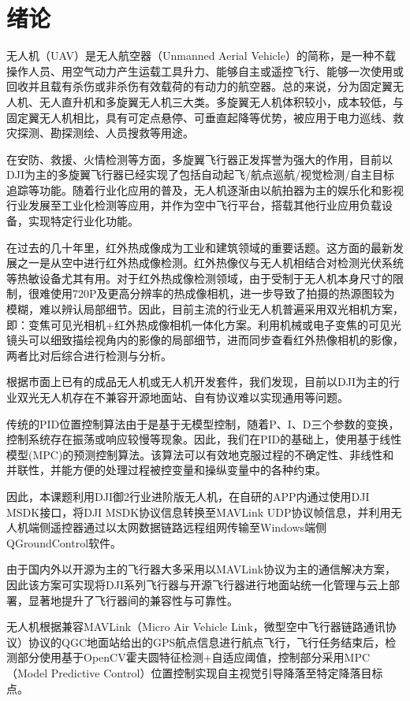 \chapter{绪论}

无人机（UAV）是无人航空器（Unmanned Aerial Vehicle）的简称，是一种不载操作人员、用空气动力产生运载工具升力、能够自主或遥控飞行、能够一次使用或回收并且载有杀伤或非杀伤有效载荷的有动力的航空器。总的来说，分为固定翼无人机、无人直升机和多旋翼无人机三大类。多旋翼无人机体积较小，成本较低，与固定翼无人机相比，具有可定点悬停、可垂直起降等优势，被应用于电力巡线、救灾探测、勘探测绘、人员搜救等用途。

在安防、救援、火情检测等方面，多旋翼飞行器正发挥誉为强大的作用，目前以DJI为主的多旋翼飞行器已经实现了包括自动起飞/航点巡航/视觉检测/自主目标追踪等功能。随着行业化应用的普及，无人机逐渐由以航拍器为主的娱乐化和影视行业发展至工业化检测等应用，并作为空中飞行平台，搭载其他行业应用负载设备，实现特定行业化功能。

在过去的几十年里，红外热成像成为工业和建筑领域的重要话题。这方面的最新发展之一是从空中进行红外热成像检测。红外热像仪与无人机相结合对检测光伏系统等热敏设备尤其有用。对于红外热成像检测领域，由于受制于无人机本身尺寸的限制，很难使用720P及更高分辨率的热成像相机，进一步导致了拍摄的热源图较为模糊，难以辨认局部细节。因此，目前主流的行业无人机普遍采用双光相机方案，即：变焦可见光相机+红外热成像相机一体化方案。利用机械或电子变焦的可见光镜头可以细致描绘视角内的影像的局部细节，进而同步查看红外热像相机的影像，两者比对后综合进行检测与分析。

根据市面上已有的成品无人机或无人机开发套件，我们发现，目前以DJI为主的行业双光无人机存在不兼容开源地面站、自有协议难以实现通用等问题。

传统的PID位置控制算法由于是基于无模型控制，随着P、I、D三个参数的变换，控制系统存在振荡或响应较慢等现象。因此，我们在PID的基础上，使用基于线性模型(MPC)的预测控制算法。该算法可以有效地克服过程的不确定性、非线性和并联性，并能方便的处理过程被控变量和操纵变量中的各种约束。

因此，本课题利用DJI御2行业进阶版无人机，在自研的APP内通过使用DJI MSDK接口，将DJI MSDK协议信息转换至MAVLink UDP协议帧信息，并利用无人机端侧遥控器通过以太网数据链路远程组网传输至Windows端侧QGroundControl软件。

由于国内外以开源为主的飞行器大多采用以MAVLink协议为主的通信解决方案，因此该方案可实现将DJI系列飞行器与开源飞行器进行地面站统一化管理与云上部署，显著地提升了飞行器间的兼容性与可靠性。

无人机根据兼容MAVLink（Micro Air Vehicle Link，微型空中飞行器链路通讯协议）协议的QGC地面站给出的GPS航点信息进行航点飞行，飞行任务结束后，检测部分使用基于OpenCV霍夫圆特征检测+自适应阈值，控制部分采用MPC（Model Predictive Control）位置控制实现自主视觉引导降落至特定降落目标点。

